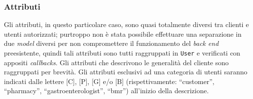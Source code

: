\subsubsection{Attributi}
Gli attributi, in questo particolare caso, sono quasi totalmente diversi tra clienti e utenti autorizzati; purtroppo non è stata possibile effettuare una separazione in due \textit{model} diversi per non compromettere il funzionamento del \textit{back end} preesistente, quindi tali attributi sono tutti raggruppati in \texttt{User} e verificati con appositi \textit{callbacks}. Gli attributi che descrivono le generalità del cliente sono raggruppati per brevità. Gli attributi esclusivi ad una categoria di utenti saranno indicati dalle lettere [C], [P], [G] e/o [B] (rispettivamente: ``customer'', ``pharmacy'', ``gastroenterologist'', ``bmr'') all'inizio della descrizione.
\label{tab:userattr}
\tabulinesep=5pt

